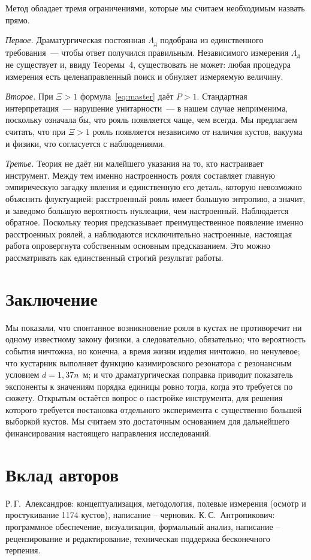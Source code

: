 \documentclass[11pt,a4paper]{article}
\newcommand{\Lnar}{\Lambda_{\text{д}}}
\begin{document}
Метод обладает тремя ограничениями, которые мы считаем необходимым назвать прямо.

\emph{Первое.} Драматургическая постоянная $\Lnar$ подобрана из единственного требования~--- чтобы ответ получился правильным. Независимого измерения $\Lnar$ не существует и, ввиду Теоремы~4, существовать не может: любая процедура измерения есть целенаправленный поиск и обнуляет измеряемую величину.

\emph{Второе.} При $\Xi > 1$ формула~\eqref{eq:master} даёт $P > 1$. Стандартная интерпретация~--- нарушение унитарности~--- в нашем случае неприменима, поскольку означала бы, что рояль появляется чаще, чем всегда. Мы предлагаем считать, что при $\Xi > 1$ рояль появляется независимо от наличия кустов, вакуума и физики, что согласуется с наблюдениями.

\emph{Третье.} Теория не даёт ни малейшего указания на то, кто настраивает инструмент. Между тем именно настроенность рояля составляет главную эмпирическую загадку явления и единственную его деталь, которую невозможно объяснить флуктуацией: расстроенный рояль имеет большую энтропию, а значит, и заведомо большую вероятность нуклеации, чем настроенный. Наблюдается обратное. Поскольку теория предсказывает преимущественное появление именно расстроенных роялей, а наблюдаются исключительно настроенные, настоящая работа опровергнута собственным основным предсказанием. Это можно рассматривать как единственный строгий результат работы.

\section{Заключение}

Мы показали, что спонтанное возникновение рояля в кустах не противоречит ни одному известному закону физики, а следовательно, обязательно; что вероятность события ничтожна, но конечна, а время жизни изделия ничтожно, но ненулевое; что кустарник выполняет функцию казимировского резонатора с резонансным условием $d = 1{,}37n$~м; и что драматургическая поправка приводит показатель экспоненты к значениям порядка единицы ровно тогда, когда это требуется по сюжету. Открытым остаётся вопрос о настройке инструмента, для решения которого требуется постановка отдельного эксперимента с существенно большей выборкой кустов. Мы считаем это достаточным основанием для дальнейшего финансирования настоящего направления исследований.

\section*{Вклад авторов}
Р.\,Г.~Александров: концептуализация, методология, полевые измерения (осмотр и простукивание 1174 кустов), написание -- черновик.
К.\,С.~Антропикович: программное обеспечение, визуализация, формальный анализ, написание -- рецензирование и редактирование, техническая поддержка бесконечного терпения.
\end{document}
